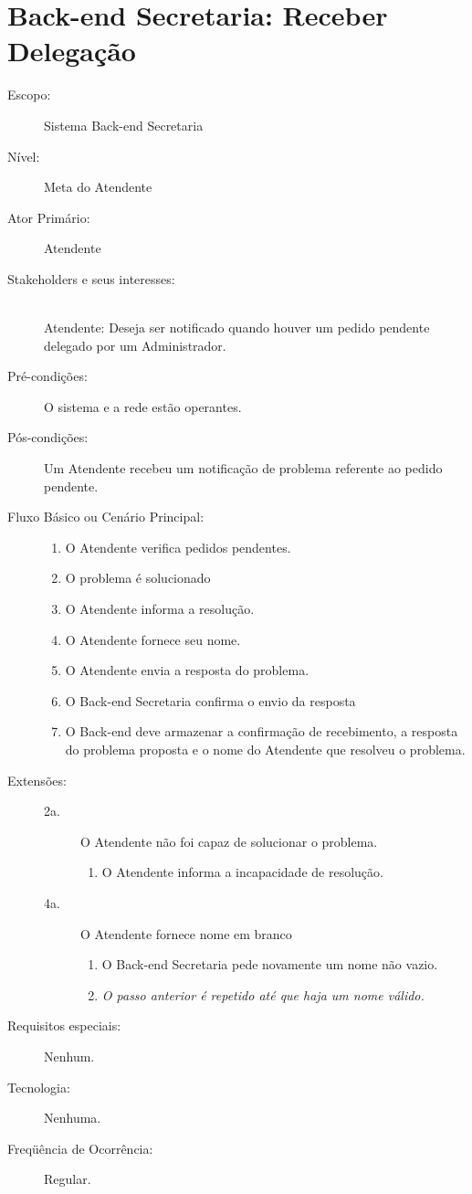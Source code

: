 \documentclass[brazil,times]{abnt}
\begin{document}
\section{Back-end Secretaria: Receber Delegação \label{caso-receber-delegacao}}
\begin{description}
\item[Escopo:] Sistema Back-end Secretaria
\item[Nível:] Meta do Atendente
\item[Ator Primário:] Atendente
\item[Stakeholders e seus interesses:] \hfill \\
Atendente: Deseja ser notificado quando houver um pedido pendente delegado por
um Administrador.

\item[Pré-condições:] O sistema e a rede estão operantes.
\item[Pós-condições:] Um Atendente recebeu um notificação de problema referente
ao pedido pendente.
\item[Fluxo Básico ou Cenário Principal:]\hfill
\begin{enumerate}
  \item O Atendente verifica pedidos pendentes.
  \item O problema é solucionado
  \item O Atendente informa a resolução.
  \item O Atendente fornece seu nome.
  \item O Atendente envia a resposta do problema.
  \item O Back-end Secretaria confirma o envio da resposta
  \item O Back-end deve armazenar a confirmação de recebimento, a resposta
  do problema proposta e o nome do Atendente que resolveu o problema.
\end{enumerate}

\item[Extensões:]\hfill
\begin{description}
	\item[2a.] O Atendente não foi capaz de solucionar o problema.
	\begin{enumerate}
 		\item O Atendente informa a incapacidade de resolução.
	\end{enumerate} 
	
	\item[4a.] O Atendente fornece nome em branco
	\begin{enumerate}
 		\item O Back-end Secretaria pede novamente um nome não vazio.
 		\item \emph{O passo anterior é repetido até que haja um nome válido.}
	\end{enumerate} 
\end{description}
\item[Requisitos especiais:] Nenhum.
\item[Tecnologia:] Nenhuma.
\item[Freqüência de Ocorrência:] Regular.

\end{description}
\end{document}
